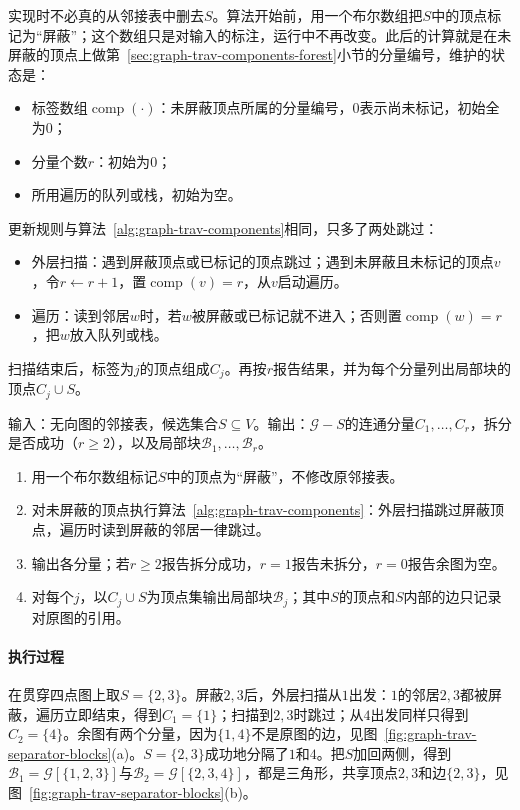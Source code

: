 实现时不必真的从邻接表中删去$S$。算法开始前，用一个布尔数组把$S$中的顶点标记为“屏蔽”；这个数组只是对输入的标注，运行中不再改变。此后的计算就是在未屏蔽的顶点上做第~\ref{sec:graph-trav-components-forest}小节的分量编号，维护的状态是：
\begin{itemize}
  \item 标签数组$\operatorname{comp}(\cdot)$：未屏蔽顶点所属的分量编号，$0$表示尚未标记，初始全为$0$；
  \item 分量个数$r$：初始为$0$；
  \item 所用遍历的队列或栈，初始为空。
\end{itemize}
更新规则与算法~\ref{alg:graph-trav-components}相同，只多了两处跳过：
\begin{itemize}
  \item 外层扫描：遇到屏蔽顶点或已标记的顶点跳过；遇到未屏蔽且未标记的顶点$v$，令$r\gets r+1$，置$\operatorname{comp}(v)=r$，从$v$启动遍历。
  \item 遍历：读到邻居$w$时，若$w$被屏蔽或已标记就不进入；否则置$\operatorname{comp}(w)=r$，把$w$放入队列或栈。
\end{itemize}
扫描结束后，标签为$j$的顶点组成$C_j$。再按$r$报告结果，并为每个分量列出局部块的顶点$C_j\cup S$。

\begin{algorithm}[删除候选集后的分量与局部块]
\label{alg:graph-trav-separator-components}
输入：无向图的邻接表，候选集合$S\subseteq V$。输出：$\mathcal G-S$的连通分量$C_1,\ldots,C_r$，拆分是否成功（$r\geq2$），以及局部块$\mathcal B_1,\ldots,\mathcal B_r$。
\begin{enumerate}
  \item 用一个布尔数组标记$S$中的顶点为“屏蔽”，不修改原邻接表。
  \item 对未屏蔽的顶点执行算法~\ref{alg:graph-trav-components}：外层扫描跳过屏蔽顶点，遍历时读到屏蔽的邻居一律跳过。
  \item 输出各分量；若$r\geq2$报告拆分成功，$r=1$报告未拆分，$r=0$报告余图为空。
  \item 对每个$j$，以$C_j\cup S$为顶点集输出局部块$\mathcal B_j$；其中$S$的顶点和$S$内部的边只记录对原图的引用。
\end{enumerate}
\end{algorithm}

\paragraph{执行过程}
在贯穿四点图上取$S=\{2,3\}$。屏蔽$2,3$后，外层扫描从$1$出发：$1$的邻居$2,3$都被屏蔽，遍历立即结束，得到$C_1=\{1\}$；扫描到$2,3$时跳过；从$4$出发同样只得到$C_2=\{4\}$。余图有两个分量，因为$\{1,4\}$不是原图的边，见图~\ref{fig:graph-trav-separator-blocks}(a)。$S=\{2,3\}$成功地分隔了$1$和$4$。把$S$加回两侧，得到$\mathcal B_1=\mathcal G[\{1,2,3\}]$与$\mathcal B_2=\mathcal G[\{2,3,4\}]$，都是三角形，共享顶点$2,3$和边$\{2,3\}$，见图~\ref{fig:graph-trav-separator-blocks}(b)。

